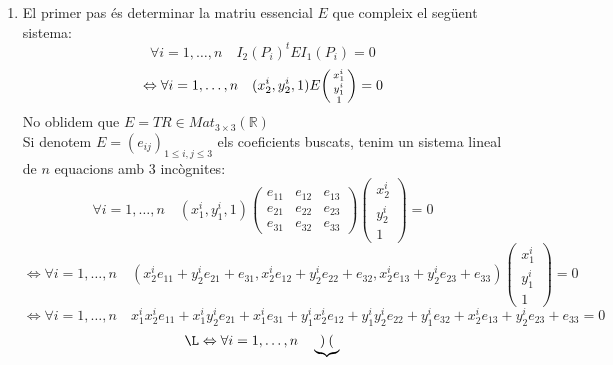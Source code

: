 \documentclass[a4paper,12pt]{article}
\begin{document}
	\begin{enumerate}
		\item El primer pas és determinar la matriu essencial $E$ que compleix el següent sistema:
		\begin{displaymath}
			\forall i = 1, \dots, n\quad I_2(P_i)^tEI_1(P_i) = 0
		\end{displaymath}
		\begin{displaymath}
			\Leftrightarrow \forall i = 1, \dots, n\quad (x_2^i, y_2^i, 1)E\begin{psmallmatrix}x_1^i\\y_1^i\\1\end{psmallmatrix} = 0
		\end{displaymath}
		No oblidem que $E = \hat{T}R \in Mat_{3\times3}(\mathbb{R})$\\
		Si denotem $E = (e_{ij})_{1 \leq i, j \leq 3}$ els coeficients buscats, tenim un sistema lineal de $n$ equacions amb $3$ incògnites:
		\begin{displaymath}
			\forall i = 1, \dots, n\quad (x_1^i, y_1^i, 1)\begin{pmatrix}e_{11}&e_{12}&e_{13}\\e_{21}&e_{22}&e_{23}\\e_{31}&e_{32}&e_{33}\end{pmatrix}\begin{pmatrix}x_2^i\\y_2^i\\1\end{pmatrix} = 0
		\end{displaymath}
		\begin{displaymath}
			\Leftrightarrow \forall i = 1, \dots, n\quad (x_2^i e_{11}+y_2^ie_{21}+e_{31}, x_2^i e_{12}+y_2^ie_{22}+e_{32}, x_2^i e_{13}+y_2^ie_{23}+e_{33})\begin{pmatrix}x_1^i\\y_1^i\\1\end{pmatrix} = 0
		\end{displaymath}
		\begin{displaymath}
			\Leftrightarrow \forall i = 1, \dots, n\quad x_1^ix_2^ie_11+x_1^iy_2^ie_{21}+x_1^ie_{31}+y_1^ix_2^ie_{12}+y_1^iy_2^ie_{22}+y_1^ie_{32}+x_2^ie_{13}+y_2^ie_{23}+e_{33} = 0
		\end{displaymath}
		\begin{displaymath}
				\L\Leftrightarrow \forall i = 1, \dots, n\quad \underbrace{\begin{pmatrix}

\end{pmatrix}}
\end{displaymath}
\end{enumerate}
\end{document}
